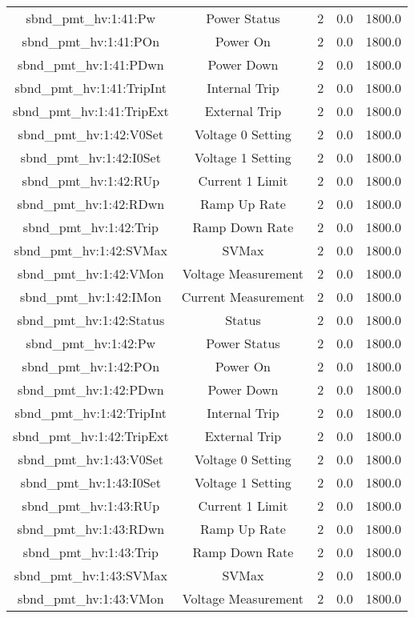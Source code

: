 \begin{center}
\begin{longtable}{c | c c c c }
sbnd\_pmt\_hv:1:41:Pw & Power Status & 2 & 0.0 & 1800.0\\ 
sbnd\_pmt\_hv:1:41:POn & Power On & 2 & 0.0 & 1800.0\\ 
sbnd\_pmt\_hv:1:41:PDwn & Power Down & 2 & 0.0 & 1800.0\\ 
sbnd\_pmt\_hv:1:41:TripInt & Internal Trip & 2 & 0.0 & 1800.0\\ 
sbnd\_pmt\_hv:1:41:TripExt & External Trip & 2 & 0.0 & 1800.0\\ 
sbnd\_pmt\_hv:1:42:V0Set & Voltage 0 Setting & 2 & 0.0 & 1800.0\\ 
sbnd\_pmt\_hv:1:42:I0Set & Voltage 1 Setting & 2 & 0.0 & 1800.0\\ 
sbnd\_pmt\_hv:1:42:RUp & Current 1 Limit & 2 & 0.0 & 1800.0\\ 
sbnd\_pmt\_hv:1:42:RDwn & Ramp Up Rate & 2 & 0.0 & 1800.0\\ 
sbnd\_pmt\_hv:1:42:Trip & Ramp Down Rate & 2 & 0.0 & 1800.0\\ 
sbnd\_pmt\_hv:1:42:SVMax & SVMax & 2 & 0.0 & 1800.0\\ 
sbnd\_pmt\_hv:1:42:VMon & Voltage Measurement & 2 & 0.0 & 1800.0\\ 
sbnd\_pmt\_hv:1:42:IMon & Current Measurement & 2 & 0.0 & 1800.0\\ 
sbnd\_pmt\_hv:1:42:Status & Status & 2 & 0.0 & 1800.0\\ 
sbnd\_pmt\_hv:1:42:Pw & Power Status & 2 & 0.0 & 1800.0\\ 
sbnd\_pmt\_hv:1:42:POn & Power On & 2 & 0.0 & 1800.0\\ 
sbnd\_pmt\_hv:1:42:PDwn & Power Down & 2 & 0.0 & 1800.0\\ 
sbnd\_pmt\_hv:1:42:TripInt & Internal Trip & 2 & 0.0 & 1800.0\\ 
sbnd\_pmt\_hv:1:42:TripExt & External Trip & 2 & 0.0 & 1800.0\\ 
sbnd\_pmt\_hv:1:43:V0Set & Voltage 0 Setting & 2 & 0.0 & 1800.0\\ 
sbnd\_pmt\_hv:1:43:I0Set & Voltage 1 Setting & 2 & 0.0 & 1800.0\\ 
sbnd\_pmt\_hv:1:43:RUp & Current 1 Limit & 2 & 0.0 & 1800.0\\ 
sbnd\_pmt\_hv:1:43:RDwn & Ramp Up Rate & 2 & 0.0 & 1800.0\\ 
sbnd\_pmt\_hv:1:43:Trip & Ramp Down Rate & 2 & 0.0 & 1800.0\\ 
sbnd\_pmt\_hv:1:43:SVMax & SVMax & 2 & 0.0 & 1800.0\\ 
sbnd\_pmt\_hv:1:43:VMon & Voltage Measurement & 2 & 0.0 & 1800.0\\ 

\end{longtable}
\end{center}
